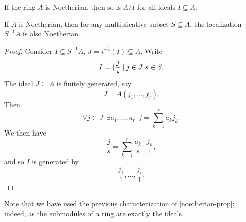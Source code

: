 \begin{lemma}
  If the ring $A$ is Noetherian, then so is $A/{I}$ for all ideals $I \subseteq A$.
\end{lemma}

\begin{lemma}
  If $A$ is Noetherian, then for any multiplicative subset $S \subseteq A$, the localization $S^{-1}A$ is also Noetherian.
\end{lemma}
\begin{proof}
  Consider $I \subseteq S^{-1}A$, $J = i^{-1}(I) \subseteq A$.
  Write
  \[ I = \{ \frac{j}{s} \mathrel{|} j \in J, s \in S.\]
  The ideal $J \subseteq A$ is finitely generated, say
  \[ J = A(j_1, \dotsc, j_r).\]
  Then
  \[ \forall j \in J \enspace \exists a_1, \dotsc, a_r \enspace j = \sum_{k=1}^r a_k j_k.\]
  We then have
  \[ \frac{j}{s} = \sum_{k=1}^r \frac{a_k}{s} \cdot \frac{j_k}{1},\]
  and so $I$ is generated by
  \[ \frac{j_1}{1}, \dotsc, \frac{j_r}{1}.\]
\end{proof}

Note that we have used the previous characterization of \cref{noetherian-prop}; indeed, as the submodules of a ring are exactly the ideals.

